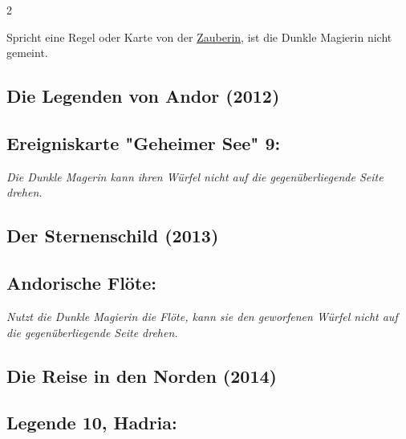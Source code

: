 \documentclass[10pt, a4paper, oneside]{book}
\newcommand{\fan}[1]{\textit{#1}}
\begin{document}
\begin{multicols*}{2}
\begin{nobgcolor}
Spricht eine Regel oder Karte von der \hyperref[Zauberin]{Zauberin}, ist die Dunkle Magierin nicht gemeint.





\end{nobgcolor}





\begin{bgcolor}

\section{Die Legenden von Andor (2012)}

\subsection{Ereigniskarte "Geheimer See" 9:}

\fan{Die Dunkle Magerin kann ihren Würfel nicht auf die gegenüberliegende Seite drehen.}


\end{bgcolor}






\begin{bgcolor}
\section{Der Sternenschild (2013)}


\subsection{Andorische Flöte:}

\fan{Nutzt die Dunkle Magierin die Flöte, kann sie den geworfenen Würfel nicht auf die gegenüberliegende Seite drehen.}

\end{bgcolor}


\begin{bgcolor}
\section{Die Reise in den Norden (2014)}





\subsection{Legende 10, Hadria:}


\end{bgcolor}
\end{multicols*}
\end{document}
